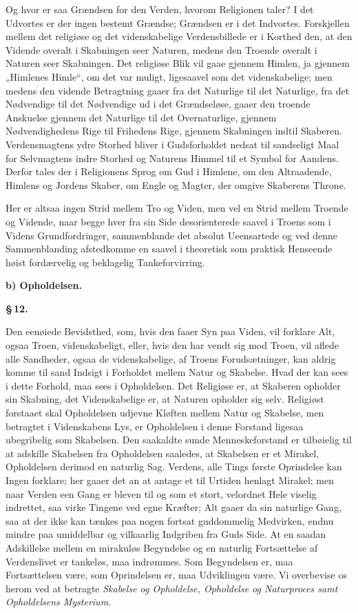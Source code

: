 \documentclass[12pt]{book}
\newcommand{\parmark}[1]{\begin{center}{\bfseries \S\,#1.}\end{center}}
\newcommand{\runhead}[1]{%
  \medskip\begin{center}{\bfseries #1}\end{center}\medskip}
\begin{document}
Og hvor er saa Grændsen for den Verden, hvorom Religionen taler? I
det Udvortes er der ingen bestemt Grændse; Grændsen er i det
Indvortes. Forskjellen mellem det religiøse og det videnskabelige
Verdensbillede er i Korthed den, at den Vidende overalt i Skabningen
seer Naturen, medens den Troende overalt i Naturen seer Skabningen.
Det religiøse Blik vil gaae gjennem Himlen, ja gjennem „Himlenes
Himle“, om det var muligt, ligesaavel som det videnskabelige; men
medens den vidende Betragtning gaaer fra det Naturlige til det
Naturlige, fra det Nødvendige til det Nødvendige ud i det
Grændseløse, gaaer den troende Anskuelse gjennem det Naturlige til
det Overnaturlige, gjennem Nødvendighedens Rige til Frihedens Rige,
gjennem Skabningen indtil Skaberen. Verdensmagtens ydre Storhed
bliver i Gudsforholdet nedsat til sandseligt Maal for Selvmagtens
indre Storhed og Naturens Himmel til et Symbol for Aandens. Derfor
tales der i Religionens Sprog om Gud i Himlene, om den Altraadende,
Himlens og Jordens Skaber, om Engle og Magter, der omgive Skaberens
Throne.

Her er altsaa ingen Strid mellem Tro og Viden, men vel en Strid
mellem Troende og Vidende, naar begge hver fra sin Side
desorienterede saavel i Troens som i Videns Grundfordringer,
sammenblande det absolut Ueensartede og ved denne Sammenblanding
afstedkomme en saavel i theoretisk som praktisk Henseende høist
fordærvelig og beklagelig Tankeforvirring.

\runhead{b) Opholdelsen.}
\parmark{12}

Den eenøiede Bevidsthed, som, hvis den faaer Syn paa Viden, vil
forklare Alt, ogsaa Troen, videnskabeligt,
eller, hvis den har vendt sig mod Troen, vil aflede alle Sandheder,
ogsaa de videnskabelige, af Troens Forudsætninger, kan aldrig komme
til sand Indsigt i Forholdet mellem Natur og Skabelse. Hvad der kan
sees i dette Forhold, maa sees i Opholdelsen. Det Religiøse er, at
Skaberen opholder sin Skabning, det Videnskabelige er, at Naturen
opholder sig selv. Religiøst forstaaet skal Opholdelsen udjevne
Kløften mellem Natur og Skabelse, men betragtet i Videnskabens Lys,
er Opholdelsen i denne Forstand ligesaa ubegribelig som Skabelsen.
Den saakaldte sunde Menneskeforstand er tilbøielig til at adskille
Skabelsen fra Opholdelsen saaledes, at Skabelsen er et Mirakel,
Opholdelsen derimod en naturlig Sag. Verdens, alle Tings første
Oprindelse kan Ingen forklare; her gaaer det an at antage et til
Urtiden henlagt Mirakel; men naar Verden een Gang er bleven til og
som et stort, velordnet Hele viselig indrettet, saa virke Tingene
ved egne Kræfter; Alt gaaer da sin naturlige Gang, saa at der ikke
kan tænkes paa nogen fortsat guddommelig Medvirken, endnu mindre paa
umiddelbar og vilkaarlig Indgriben fra Guds Side. At en saadan
Adskillelse mellem en mirakuløs Begyndelse og en naturlig
Fortsættelse af Verdenslivet er tankeløs, maa indrømmes. Som
Begyndelsen er, maa Fortsættelsen være, som Oprindelsen er, maa
Udviklingen være. Vi overbevise os herom ved at betragte
\emph{Skabelse og Opholdelse, Opholdelse og Naturproces samt
Opholdelsens Mysterium.}
\end{document}
